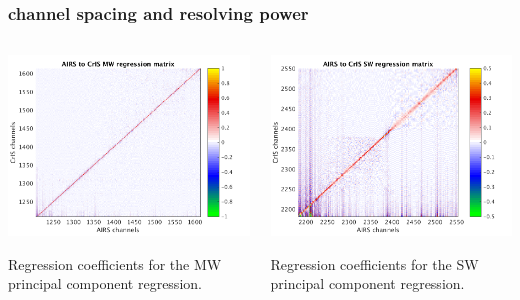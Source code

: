 \documentclass[10pt]{beamer}
\begin{document}
\begin{frame}
\frametitle{channel spacing and resolving power}
\begin{columns}[t]
\begin{column}{0.5\textwidth}
  \begin{centering}
  \includegraphics[width=\textwidth]{slackfigs/MW_pc_regr_mat.png}
  \end{centering}\vspace{3mm}
  Regression coefficients for the MW principal component
  regression. 
 
\end{column}
\begin{column}{0.5\textwidth}  
  \begin{centering}
  \includegraphics[width=\textwidth]{slackfigs/SW_pc_regr_mat.png}
  \end{centering}\vspace{3mm}
  Regression coefficients for the SW principal component regression.

\end{column}
\end{columns}
\end{frame}
\end{document}
